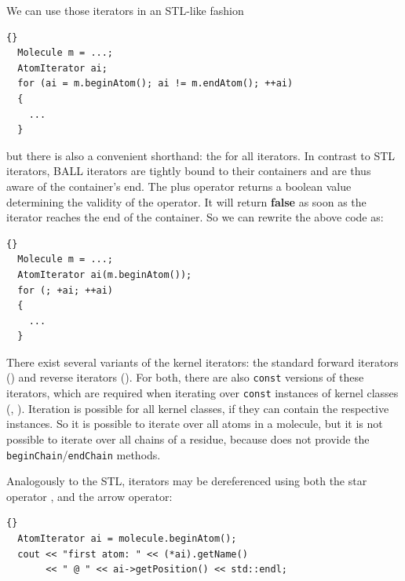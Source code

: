 We can use those iterators in an STL-like fashion

\begin{lstlisting}{}
  Molecule m = ...;
  AtomIterator ai;
  for (ai = m.beginAtom(); ai != m.endAtom(); ++ai)
  {
    ...
  }
\end{lstlisting}

\noindent but there is also a convenient shorthand: the 
for all iterators. In contrast to STL iterators, BALL iterators are tightly 
bound to their containers and are thus aware of the container's end.
The plus operator returns a boolean value determining the validity of the
operator. It will return {\bf false} as soon as the iterator reaches the
end of the container. So we can rewrite the above code as:

\begin{lstlisting}{}
  Molecule m = ...;
  AtomIterator ai(m.beginAtom());
  for (; +ai; ++ai)
  {
    ...
  }
\end{lstlisting}

\noindent 
There exist several variants of the kernel iterators: the standard
forward iterators (\eg {}) and reverse iterators
(). For both, there are also {\tt const} versions of
these iterators, which are required when iterating over {\tt const}  instances
of kernel classes (,
).
Iteration is possible for all kernel classes, if they can contain the
respective instances. So it is possible to iterate over all atoms in a
molecule, but it is not possible to iterate over all chains of a residue,
because  does not provide the {\tt beginChain}/{\tt endChain}
methods.

Analogously to the STL, iterators may be dereferenced using both the star 
operator , and the arrow operator: 

\begin{lstlisting}{}
  AtomIterator ai = molecule.beginAtom();
  cout << "first atom: " << (*ai).getName() 
       << " @ " << ai->getPosition() << std::endl;
\end{lstlisting}

